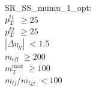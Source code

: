 SR\_SS\_mumu\_1\_opt: \\
$p_{\text{T}}^{l1}$ $\geq 25$ \\
$p_{\text{T}}^{l2}$ $\geq 25$ \\
$|\Delta\eta_{ll}|$ $<1.5$ \\
$m_{\text{eff}}$ $\geq 200$ \\
$m_{\text{T}}^{\text{max}}$ $\geq 100$ \\
$m_{lj}$/$m_{ljj}$ $<100$ \\
